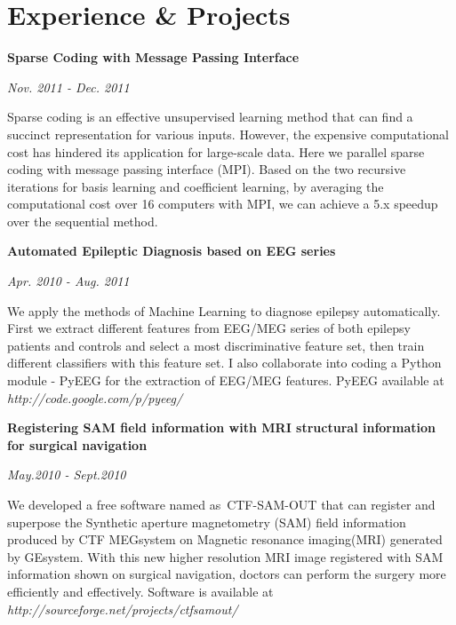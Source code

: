 \documentclass[letterpaper, 10pt]{article}
\renewenvironment{itemize}{
  \begin{list}{}{
    \setlength{\leftmargin}{1.5em}
  }
}{
  \end{list}
}
\begin{document}
\section*{Experience \& Projects}
\begin{itemize}
\item \textbf{Sparse Coding with Message Passing Interface}

\hspace{13.5cm} \textit{Nov. 2011 - Dec. 2011}
\begin{itemize}
\item{Sparse coding is an effective unsupervised learning method that can find a succinct representation for various inputs. However, the
expensive computational cost has hindered its application for large-scale data. Here we parallel sparse coding with message passing interface (MPI). Based on the two recursive iterations for basis learning and coefficient learning, by averaging the computational cost over 16 computers with MPI, we can achieve a 5.x speedup over the sequential method.
}
\end{itemize}
\item \textbf{Automated Epileptic Diagnosis based on {EEG} series}

\hspace{13.5cm} \textit{Apr. 2010 - Aug. 2011}
\begin{itemize}
\item{We apply the methods of Machine Learning to diagnose epilepsy automatically. First we extract different features
from {EEG/MEG} series of both epilepsy patients and controls and select a most discriminative feature set, then train different classifiers with
this feature set. I also collaborate into coding a Python module - {PyEEG} for the extraction of {EEG/MEG} features. {PyEEG} available at 
\textit{http://code.google.com/p/pyeeg/}}
\end{itemize}

\item \textbf{Registering SAM field information with MRI structural information for surgical navigation}

\hspace{13.5cm}\textit{May.2010 - Sept.2010}
\begin{itemize}
\item{We developed a free software named as~{CTF-SAM-OUT} that can register and superpose the Synthetic aperture 
magnetometry (SAM) field information produced by CTF MEG\texttrademark system on Magnetic resonance imaging(MRI) generated by 
GE\texttrademark system. With this new higher resolution MRI image registered with SAM information shown on surgical navigation, doctors can 
perform the surgery more efficiently and effectively. Software is available at \textit{http://sourceforge.net/projects/ctfsamout/}}
\end{itemize}
\end{itemize}
\end{document}
